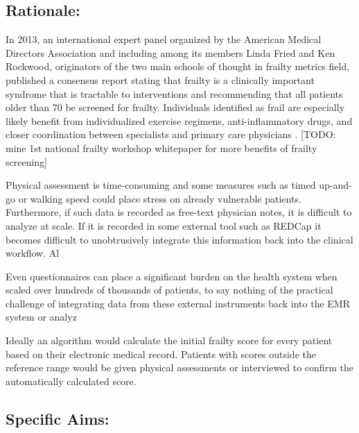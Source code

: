 \subsection{Rationale:}\label{rationale}
In 2013, an international expert panel organized by the American Medical Directors Association and including among its members Linda Fried and Ken Rockwood, originators of the two main schools of thought in frailty metrics field, published a consensus report \cite{Morley_2013} stating that frailty is a clinically important syndrome that is tractable to interventions and recommending that all patients older than 70 be screened for frailty. Individuals identified as frail are especially likely benefit from individualized exercise regimens, anti-inflammatory drugs, and closer coordination between specialists and primary care physicians \citep{16392724}. [TODO: mine 1st national frailty workshop whitepaper for more benefits of frailty screening]

Physical assessment is time-consuming and some measures such as timed up-and-go or walking speed \cite{10811152} could place stress on already vulnerable patients. Furthermore, if such data is recorded as free-text physician notes, it is difficult to analyze at scale. If it is recorded in some external tool such as REDCap \cite{Harris_2009} it becomes difficult to unobtrusively integrate this information back into the clinical workflow. Al

Even questionnaires can place a significant burden on the health system when scaled over hundreds of thousands of patients, to say nothing of the practical challenge of integrating data from these external instruments back into the EMR system or analyz

Ideally an algorithm would calculate the initial frailty score for every patient based on their electronic medical record. Patients with scores outside the reference range would be given physical assessments or interviewed to confirm the automatically calculated score.  

\subsection{Specific Aims:}\label{specific-aims}
